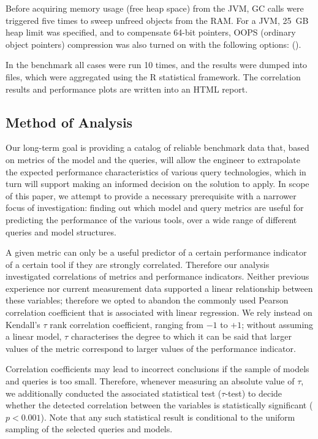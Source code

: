 Before acquiring memory usage (free heap space) from the JVM, GC calls were triggered five times to sweep unfreed objects from the RAM. For a JVM, 25~GB heap limit was specified, and to compensate 64-bit pointers, OOPS (ordinary object pointers) compression was also turned on with the following options: ().

In the benchmark all cases were run 10 times, and the results were dumped into files, which were aggregated using the R statistical framework. The correlation results and performance plots are written into an HTML report.


\subsection{Method of Analysis}
Our long-term goal is providing a catalog of reliable benchmark data that,
based on metrics of the model and the queries, will allow the engineer to
extrapolate the expected performance characteristics of various query
technologies, which in turn will support making an informed decision on the
solution to apply. In scope of this paper, we attempt to provide a necessary
prerequisite with a narrower focus of investigation: finding out which model and
query metrics are useful for predicting the performance 
of the various tools, over a wide range of different queries and model
structures.

A given metric can only be a useful predictor of a certain performance indicator
of a certain tool if they are strongly correlated. Therefore our analysis
investigated correlations of metrics and performance indicators. Neither
previous experience nor current measurement data supported a linear relationship
between these variables; therefore we opted to abandon the commonly used Pearson
correlation coefficient that is associated with linear regression. We rely
instead on Kendall's $\tau$ %
 rank correlation coefficient, ranging from $-1$ to $+1$; without assuming a
 linear model, $\tau$ characterises the degree to which it can be said that
 larger values of the metric correspond to larger values of the performance
 indicator.

Correlation coefficients may lead to incorrect conclusions if the sample of
models and queries is too small. Therefore, whenever measuring an absolute value
of $\tau$, we additionally conducted the associated statistical test
($\tau$-test) to decide whether the detected correlation between the variables
is statistically significant ($p < 0.001$). Note that any such statistical result
is conditional to the uniform sampling of the selected queries and models.


